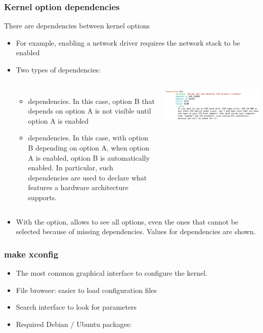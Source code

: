 \begin{frame}[fragile]
  \frametitle{Kernel option dependencies}
  There are dependencies between kernel options
  \begin{itemize}
  \item For example, enabling a network driver requires the network
    stack to be enabled
  \item Two types of dependencies:
  \begin{columns}
    \begin{itemize}
    \item {} dependencies. In this case, option B that
      depends on option A is not visible until option A is enabled
    \item {} dependencies. In this case, with option B
      depending on option A, when option A is enabled, option B is
      automatically enabled. In particular, such dependencies are
      used to declare what features a hardware architecture supports.
    \end{itemize}
    \includegraphics[width=\textwidth]{slides/sysdev-kernel-building/kconfig-dependencies.png}
  \end{columns}
  \item With the  option,  allows
    to see all options, even the ones that cannot be selected because of
    missing dependencies. Values for dependencies are shown.
  \end{itemize}
\end{frame}

\begin{frame}
  \frametitle{make xconfig}
  \begin{itemize}
  \item The most common graphical interface to configure the kernel.
  \item File browser: easier to load configuration files
  \item Search interface to look for parameters
 \item Required Debian / Ubuntu packages: 
  \end{itemize}
\end{frame}

